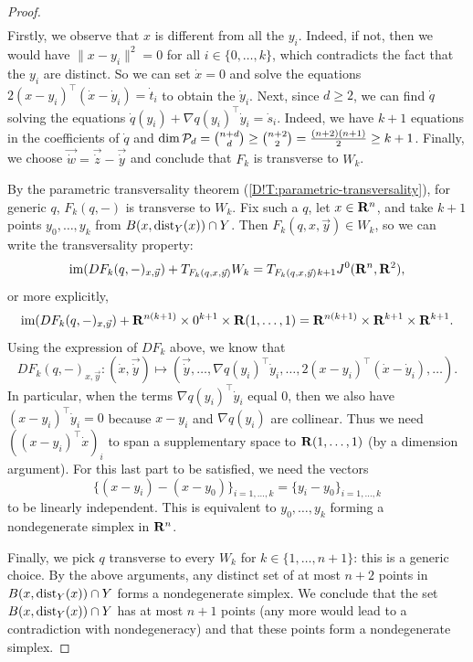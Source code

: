 \begin{proof}
\begin{align*}
  \end{align*}
  Firstly, we observe that $x$ is different from all the $y_i$. Indeed, if not, then we would have $\| x - y_i \|^2 = 0$ for all $i \in \{0, \ldots, k\}$, which contradicts the fact that the $y_i$ are distinct. So we can set $\dot{x} = 0$ and solve the equations $2(x - y_i)^\top (\dot{x} - \dot{y}_i) = \dot{t}_i$ to obtain the $\dot{y}_i$.
  Next, since $d \geq 2$, we can find $\dot{q}$ solving the equations $\dot{q}(y_i) + \nabla q(y_i)^\top \dot{y}_i = \dot{s}_i$. Indeed, we have $k + 1$ equations in the coefficients of $\dot{q}$ and $\dim \mathcal{P}_d = \binom{n + d}{d} \geq \binom{n + 2}{2} = \frac{(n + 2)(n + 1)}{2} \geq k + 1$.
  Finally, we choose $\vec{\dot{w}} = \vec{\dot{z}} - \vec{\dot{y}}$ and conclude that $F_k$ is transverse to $W_k$.

  By the parametric transversality theorem (\cref{D!T:parametric-transversality}), for generic $q$, $F_k(q, -)$ is transverse to $W_k$. Fix such a $q$, let $x \in \mathbf{R}^n$, and take $k + 1$ points $y_0, \ldots, y_k$ from $B(x, \operatorname{dist}_Y(x)) \cap Y$. Then $F_k(q, x, \vec{y}) \in W_k$, so we can write the transversality property:
  \[
    \textnormal{im}(DF_k(q, -)_{x, \vec{y}}) + T_{F_k(q, x, \vec{y})} W_k = T_{F_k(q, x, \vec{y})} {}_{k + 1} J^0(\mathbf{R}^n, \mathbf{R}^2),
  \]
  or more explicitly,
  \[
    \textnormal{im}(DF_k(q, -)_{x, \vec{y}}) + \mathbf{R}^{n (k + 1)} \times 0^{k + 1} \times \mathbf{R} (1, \ldots, 1) = \mathbf{R}^{n (k + 1)} \times \mathbf{R}^{k + 1} \times \mathbf{R}^{k + 1}.
  \]
  Using the expression of $DF_k$ above, we know that
  \[
    DF_k(q, -)_{x, \vec{y}} \colon (\dot{x}, \vec{\dot{y}}) \mapsto (\vec{\dot{y}}, \ldots, \nabla q(y_i)^\top \dot{y}_i, \ldots, 2(x - y_i)^\top (\dot{x} - \dot{y}_i), \ldots).
  \]
  In particular, when the terms $\nabla q(y_i)^\top \dot{y}_i$ equal $0$, then we also have $(x - y_i)^\top \dot{y}_i = 0$ because $x - y_i$ and $\nabla q(y_i)$ are collinear. Thus we need $((x - y_i)^\top \dot{x})_i$ to span a supplementary space to $\mathbf{R} (1, \ldots, 1)$ (by a dimension argument). For this last part to be satisfied, we need the vectors
  \[
    \{(x - y_i) - (x - y_0)\}_{i = 1, \ldots, k} = \{y_i - y_0\}_{i = 1, \ldots ,k}
  \]
  to be linearly independent. This is equivalent to $y_0, \ldots, y_k$ forming a nondegenerate simplex in $\mathbf{R}^n$.

  Finally, we pick $q$ transverse to every $W_k$ for $k \in \{1, \ldots, n + 1\}$: this is a generic choice. By the above arguments, any distinct set of at most $n + 2$ points in $B(x, \operatorname{dist}_Y(x)) \cap Y$ forms a nondegenerate simplex. We conclude that the set $B(x, \operatorname{dist}_Y(x)) \cap Y$ has at most $n + 1$ points (any more would lead to a contradiction with nondegeneracy) and that these points form a nondegenerate simplex.
\end{proof}

